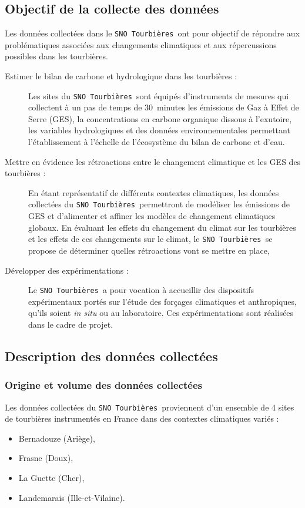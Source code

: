 \documentclass[]{article}
\newcommand{\SNOT}{{\tt SNO~Tourbières }}
\begin{document}
\subsection{Objectif de la collecte des données}
	
Les données collectées dans le \SNOT ont pour objectif de répondre aux problématiques associées aux changements climatiques et aux répercussions possibles dans les tourbières.
	
\begin{description}
	\item[Estimer le bilan de carbone et hydrologique dans les tourbières :] Les sites du \SNOT sont équipés d’instruments de mesures qui collectent à un pas de temps de 30~minutes les émissions de Gaz à Effet de Serre (GES), la concentrations en carbone organique dissous à l’exutoire, les variables hydrologiques et des données environnementales permettant l’établissement à l'échelle de l’écosystème du bilan de carbone et d'eau.
	\item[Mettre en évidence les rétroactions entre le changement climatique et les GES des tourbières : ] En étant représentatif de différents contextes climatiques, les données collectées du \SNOT permettront de modéliser les émissions de GES et d'alimenter et affiner les modèles de changement climatiques globaux. En évaluant les effets du changement du climat sur les tourbières et les effets de ces changements sur le climat, le \SNOT se propose de déterminer quelles rétroactions vont se mettre en place,
	\item[Développer des expérimentations :] Le \SNOT a pour vocation à accueillir des dispositifs expérimentaux portés sur l’étude des forçages climatiques et anthropiques, qu'ils soient \textit{in situ} ou au laboratoire. Ces expérimentations sont réalisées dans le cadre de projet.
\end{description}
	
\subsection{Description des données collectées}
	
\subsubsection{Origine et volume des données collectées}
Les données collectées du \SNOT proviennent d'un ensemble de 4 sites de tourbières instrumentés en France dans des contextes climatiques variés :
\begin{itemize}
	\item Bernadouze (Ariège),
	\item Frasne (Doux),
	\item La Guette (Cher),
	\item Landemarais (Ille-et-Vilaine).\\
\end{itemize}
	
\end{document}
